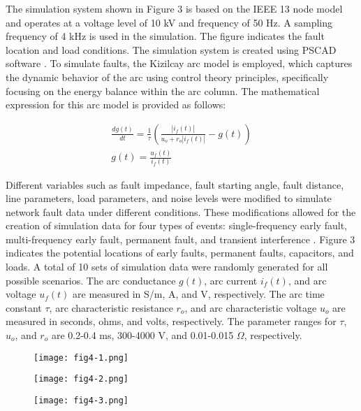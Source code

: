 \documentclass[conference]{IEEEtran}
\begin{document}
The simulation system shown in Figure 3 is based on the IEEE 13 node model and operates at a voltage level of 10 kV and frequency of 50 Hz. A sampling frequency of 4 kHz is used in the simulation. The figure indicates the fault location and load conditions. The simulation system is created using PSCAD software \cite{liu2021method}. To simulate faults, the Kizilcay arc model is employed, which captures the dynamic behavior of the arc using control theory principles, specifically focusing on the energy balance within the arc column. The mathematical expression for this arc model is provided as follows: 

$$
\begin{gathered}
\frac{d g(t)}{d t}=\frac{1}{\tau}\left(\frac{\left|i_{f}(t)\right|}{u_{o}+r_{o}\left|i_{f}(t)\right|}-g(t)\right) \\
g(t)=\frac{u_{f}(t)}{i_{f}(t)}
\end{gathered}
$$


Different variables such as fault impedance, fault starting angle, fault distance, line parameters, load parameters, and noise levels were modified to simulate network fault data under different conditions. These modifications allowed for the creation of simulation data for four types of events: single-frequency early fault, multi-frequency early fault, permanent fault, and transient interference \cite{liu2020basic}. Figure 3 indicates the potential locations of early faults, permanent faults, capacitors, and loads. A total of 10 sets of simulation data were randomly generated for all possible scenarios. The arc conductance $g(t)$, arc current $i_f(t)$, and arc voltage $u_f(t)$ are measured in S/m, A, and V, respectively. The arc time constant $\tau$, arc characteristic resistance $r_o$, and arc characteristic voltage $u_o$ are measured in seconds, ohms, and volts, respectively. The parameter ranges for $\tau$, $u_o$, and $r_o$ are 0.2-0.4 ms, 300-4000 V, and 0.01-0.015 $\Omega$, respectively.

\begin{figure}[htbp]
\centerline{\texttt{[image: fig4-1.png]}}
\end{figure}

\begin{figure}[htbp]
\centerline{\texttt{[image: fig4-2.png]}}
\end{figure}

\begin{figure}[htbp]
\centerline{\texttt{[image: fig4-3.png]}}
\end{figure}
\end{document}
